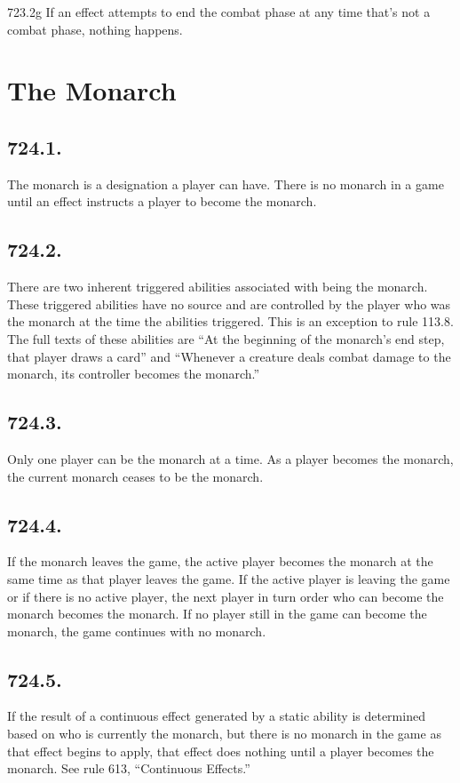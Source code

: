 723.2g If an effect attempts to end the combat phase at any time that’s not a combat phase, nothing happens.

\section{The Monarch}
\subsection*{724.1.}
The monarch is a designation a player can have. There is no monarch in a game until an effect instructs a player to become the monarch.

\subsection*{724.2.}
There are two inherent triggered abilities associated with being the monarch. These triggered abilities have no source and are controlled by the player who was the monarch at the time the abilities triggered. This is an exception to rule 113.8. The full texts of these abilities are “At the beginning of the monarch’s end step, that player draws a card” and “Whenever a creature deals combat damage to the monarch, its controller becomes the monarch.”

\subsection*{724.3.}
Only one player can be the monarch at a time. As a player becomes the monarch, the current monarch ceases to be the monarch.

\subsection*{724.4.}
If the monarch leaves the game, the active player becomes the monarch at the same time as that player leaves the game. If the active player is leaving the game or if there is no active player, the next player in turn order who can become the monarch becomes the monarch. If no player still in the game can become the monarch, the game continues with no monarch.

\subsection*{724.5.}
If the result of a continuous effect generated by a static ability is determined based on who is currently the monarch, but there is no monarch in the game as that effect begins to apply, that effect does nothing until a player becomes the monarch. See rule 613, “Continuous Effects.”

